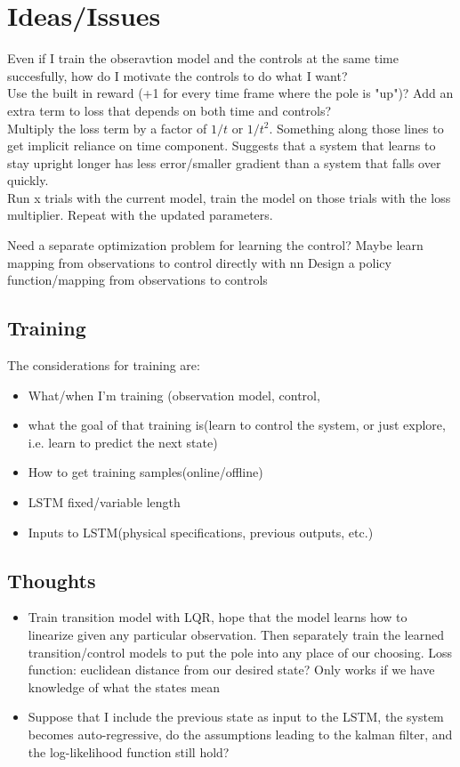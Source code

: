 \documentclass[twoside]{article}
\begin{document}
\section{Ideas/Issues}
Even if I train the obseravtion model and the controls at the same time succesfully, how do I motivate the controls to do what I want?\\

Use the built in reward (+1 for every time frame where the pole is "up")? Add an extra term to loss that depends on both time and controls?\\

Multiply the loss term by a factor of $1/t$ or $1/t^{2}$. Something along those lines to get implicit reliance on time component. Suggests that a system that learns to stay upright longer has less error/smaller gradient than a system that falls over quickly.\\

Run x trials with the current model, train the model on those trials with the loss multiplier. Repeat with the updated parameters.

Need a separate optimization problem for learning the control? Maybe learn mapping from observations to control directly with nn
Design a policy function/mapping from observations to controls

\subsection{Training}
The considerations for training are:
\begin{itemize}
\item What/when I'm training (observation model, control, 
\item what the goal of that training is(learn to control the system, or just explore, i.e. learn to predict the next state)
\item How to get training samples(online/offline)
\item LSTM fixed/variable length
\item Inputs to LSTM(physical specifications, previous outputs, etc.)
\end{itemize}
\subsection{Thoughts}
\begin{itemize}
\item Train transition model with LQR, hope that the model learns how to linearize given any particular observation. Then separately train the learned transition/control models to put the pole into any place of our choosing. 
Loss function: euclidean distance from our desired state? Only works if we have knowledge of what the states mean
\item Suppose that I include the previous state as input to the LSTM, the system becomes auto-regressive, do the assumptions leading to the kalman filter, and the log-likelihood function still hold?
\end{itemize}
\end{document}

